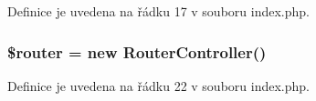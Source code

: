 Definice je uvedena na řádku 17 v souboru index.\-php.

\hypertarget{index_8php_ad77f00d881c7c3dc8bd1749c7174de92}{
\subsubsection[{\$router}]{\setlength{\rightskip}{0pt plus 5cm}\$router = new {\bf Router\-Controller}()}}\label{index_8php_ad77f00d881c7c3dc8bd1749c7174de92}


Definice je uvedena na řádku 22 v souboru index.\-php.

